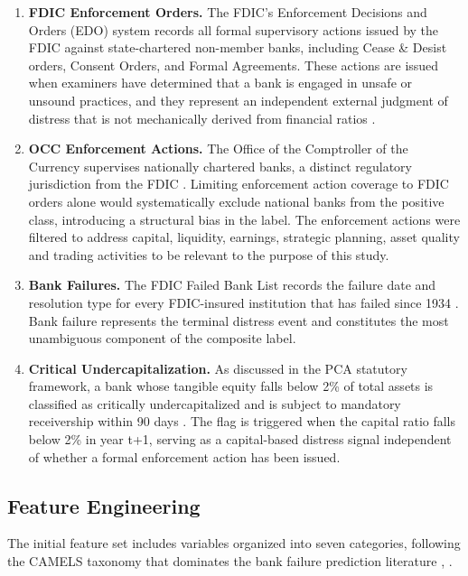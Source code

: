 \documentclass[conference]{IEEEtran}
\begin{document}
\begin{enumerate}
    \item \textbf{FDIC Enforcement Orders.} The FDIC's Enforcement Decisions and Orders (EDO) system records all formal supervisory actions issued by the FDIC against state-chartered non-member banks, including Cease \& Desist orders, Consent Orders, and Formal Agreements. These actions are issued when examiners have determined that a bank is engaged in unsafe or unsound practices, and they represent an independent external judgment of distress that is not mechanically derived from financial ratios \cite{b18}. 

    \item \textbf{OCC Enforcement Actions.} The Office of the Comptroller of the Currency supervises nationally chartered banks, a distinct regulatory jurisdiction from the FDIC \cite{b19}. Limiting enforcement action coverage to FDIC orders alone would systematically exclude national banks from the positive class, introducing a structural bias in the label. The enforcement actions were filtered to address capital, liquidity, earnings, strategic planning, asset quality and trading activities to be relevant to the purpose of this study.

    \item \textbf{Bank Failures.} The FDIC Failed Bank List records the failure date and resolution type for every FDIC-insured institution that has failed since 1934 \cite{b25}. Bank failure represents the terminal distress event and constitutes the most unambiguous component of the composite label. 

    \item \textbf{Critical Undercapitalization.} As discussed in the PCA statutory framework, a bank whose tangible equity falls below 2\% of total assets is classified as critically undercapitalized and is subject to mandatory receivership within 90 days \cite{b20}. The flag is triggered when the capital ratio falls below 2\% in year t+1, serving as a capital-based distress signal independent of whether a formal enforcement action has been issued.
\end{enumerate}

\subsection{Feature Engineering}

The initial feature set includes variables organized into seven categories, following the CAMELS taxonomy that dominates the bank failure prediction literature \cite{b1}, \cite{b4}.
\end{document}
